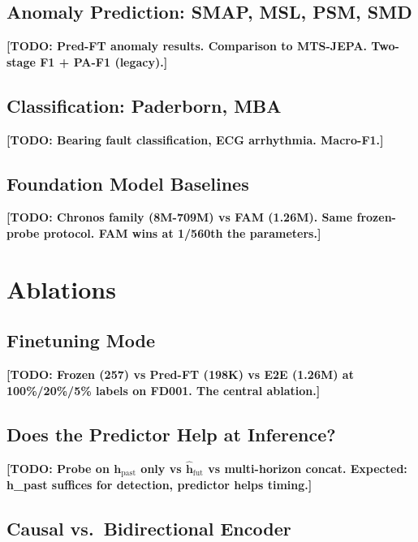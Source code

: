 \documentclass{article}
\newcommand{\todo}[1]{{\color{orange}\textbf{[TODO: #1]}}}
\newcommand{\todo}[1]{}
\newcommand{\h}{\mathbf{h}}
\begin{document}
\subsection{Anomaly Prediction: SMAP, MSL, PSM, SMD}
\label{sec:anomaly_results}

\todo{Pred-FT anomaly results. Comparison to MTS-JEPA. Two-stage F1 + PA-F1 (legacy).}

\subsection{Classification: Paderborn, MBA}
\label{sec:classification_results}

\todo{Bearing fault classification, ECG arrhythmia. Macro-F1.}

\subsection{Foundation Model Baselines}
\label{sec:foundation_baselines}

\todo{Chronos family (8M-709M) vs FAM (1.26M). Same frozen-probe protocol. FAM wins at 1/560th the parameters.}

\section{Ablations}
\label{sec:ablations}

\subsection{Finetuning Mode}
\label{sec:finetune_ablation}

\todo{Frozen (257) vs Pred-FT (198K) vs E2E (1.26M) at 100\%/20\%/5\% labels on FD001. The central ablation.}

\subsection{Does the Predictor Help at Inference?}
\label{sec:predictor_ablation}

\todo{Probe on $\h_\text{past}$ only vs $\hat{\h}_\text{fut}$ vs multi-horizon concat. Expected: h\_past suffices for detection, predictor helps timing.}

\subsection{Causal vs.\ Bidirectional Encoder}
\label{sec:causal_ablation}
\end{document}
